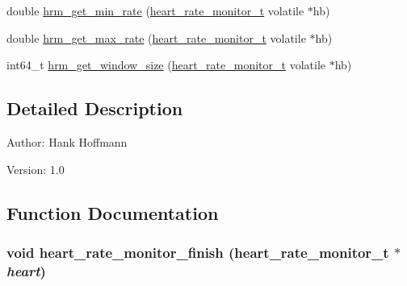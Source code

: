 \begin{CompactItemize}
\item 
double \hyperlink{heart__rate__monitor-file_8c_d0ea463faa51e1bf20b3f5efbc4c91c3}{hrm\_\-get\_\-min\_\-rate} (\hyperlink{structheart__rate__monitor__t}{heart\_\-rate\_\-monitor\_\-t} volatile $\ast$hb)
\item 
double \hyperlink{heart__rate__monitor-file_8c_f7f779cd6a79780479064da8b6eb05e7}{hrm\_\-get\_\-max\_\-rate} (\hyperlink{structheart__rate__monitor__t}{heart\_\-rate\_\-monitor\_\-t} volatile $\ast$hb)
\item 
int64\_\-t \hyperlink{heart__rate__monitor-file_8c_1249c1ba65c775d2701de15b4415fded}{hrm\_\-get\_\-window\_\-size} (\hyperlink{structheart__rate__monitor__t}{heart\_\-rate\_\-monitor\_\-t} volatile $\ast$hb)
\end{CompactItemize}


\subsection{Detailed Description}
\begin{Desc}
\item[Author:]Hank Hoffmann \end{Desc}
\begin{Desc}
\item[Version:]1.0 \end{Desc}


\subsection{Function Documentation}
\hypertarget{heart__rate__monitor-file_8c_070d042cdc3717897098cc6ac9682427}{
\subsubsection[heart\_\-rate\_\-monitor\_\-finish]{\setlength{\rightskip}{0pt plus 5cm}void heart\_\-rate\_\-monitor\_\-finish ({\bf heart\_\-rate\_\-monitor\_\-t} $\ast$ {\em heart})}}
\label{heart__rate__monitor-file_8c_070d042cdc3717897098cc6ac9682427}


